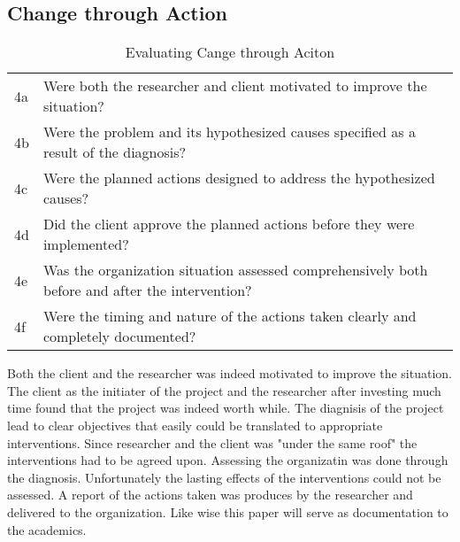 \subsection{Change through Action}
\begin{table}
\centering
\begin{tabular}{p{2cm} p{8cm}}
\hline
4a & Were both the researcher and client motivated to improve the situation? \\
4b & Were the problem and its hypothesized causes specified as a result of the diagnosis? \\
4c & Were the planned actions designed to address the hypothesized causes? \\
4d & Did the client approve the planned actions before they were implemented? \\
4e & Was the organization situation assessed comprehensively both before and after the intervention? \\
4f & Were the timing and nature of the actions taken clearly and completely documented? \\
\hline
\end{tabular}
\caption{Evaluating Cange through Aciton}
\label{tab:evachange}
\end{table}
Both the client and the researcher was indeed motivated to improve the situation.
The client as the initiater of the project and the researcher after investing much time found that the project was indeed worth while.
The diagnisis of the project lead to clear objectives that easily could be translated to appropriate interventions.
Since researcher and the client was "under the same roof" the interventions had to be agreed upon. 
Assessing the organizatin was done through the diagnosis. Unfortunately the lasting effects of the interventions could not be assessed. 
A report of the actions taken was produces by the researcher and delivered to the organization. 
Like wise this paper will serve as documentation to the academics. 
